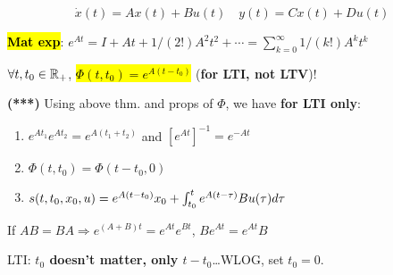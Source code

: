\vspace{-2mm}
\begin{equation}\label{eq:LTI}
\dot x(t)=Ax(t)+Bu(t)\quad
y(t) = Cx(t)+Du(t)
\end{equation}

\begin{Definition}
\textbf{\hl{Mat exp}}: $e^{At}=I+At+1/(2!)A^2t^2+\cdots=\sum_{k=0}^\infty 1/(k!)A^kt^k$
\end{Definition}
\begin{Theorem}
$\forall t,t_0\in\mathbb R_+$, \hl{$\Phi(t,t_0)=e^{A(t-t_0)}$} (\textbf{for LTI, not LTV})!
\end{Theorem}
\begin{Corollary}
{\color{red}\textbf{(***)}} Using above thm. and props of $\Phi$, we have \textbf{for LTI only}: 
\begin{enumerate}
  \item $e^{At_1}e^{At_2}=e^{A(t_1+t_2)}$ and $[e^{At}]^{-1}=e^{-At}$
  \item $\Phi(t,t_0)=\Phi(t-t_0,0)$
  \item $s(t,t_0,x_0,u)=e^{A(t-t_0)}x_0+\int_{t_0}^te^{A(t-\tau)}Bu(\tau)d\tau$
\end{enumerate}
\end{Corollary}
If $AB=BA\Rightarrow e^{(A+B)t}=e^{At}e^{Bt}$, $B e^{At}=e^{At} B$

LTI: \textbf{$t_0$ doesn't matter, only $t-t_0$}\ldots WLOG, set $t_0=0$.

